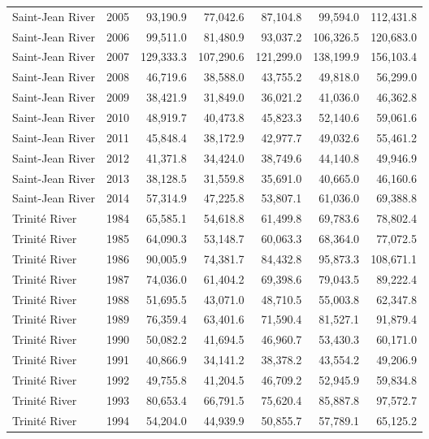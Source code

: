 \begin{longtable}{llrrrrr}
  Saint-Jean River & 2005 & 93,190.9 & 77,042.6 & 87,104.8 & 99,594.0 & 112,431.8 \\ 
  Saint-Jean River & 2006 & 99,511.0 & 81,480.9 & 93,037.2 & 106,326.5 & 120,683.0 \\ 
  Saint-Jean River & 2007 & 129,333.3 & 107,290.6 & 121,299.0 & 138,199.9 & 156,103.4 \\ 
  Saint-Jean River & 2008 & 46,719.6 & 38,588.0 & 43,755.2 & 49,818.0 & 56,299.0 \\ 
  Saint-Jean River & 2009 & 38,421.9 & 31,849.0 & 36,021.2 & 41,036.0 & 46,362.8 \\ 
  Saint-Jean River & 2010 & 48,919.7 & 40,473.8 & 45,823.3 & 52,140.6 & 59,061.6 \\ 
  Saint-Jean River & 2011 & 45,848.4 & 38,172.9 & 42,977.7 & 49,032.6 & 55,461.2 \\ 
  Saint-Jean River & 2012 & 41,371.8 & 34,424.0 & 38,749.6 & 44,140.8 & 49,946.9 \\ 
  Saint-Jean River & 2013 & 38,128.5 & 31,559.8 & 35,691.0 & 40,665.0 & 46,160.6 \\ 
  Saint-Jean River & 2014 & 57,314.9 & 47,225.8 & 53,807.1 & 61,036.0 & 69,388.8 \\ 
  Trinité River & 1984 & 65,585.1 & 54,618.8 & 61,499.8 & 69,783.6 & 78,802.4 \\ 
  Trinité River & 1985 & 64,090.3 & 53,148.7 & 60,063.3 & 68,364.0 & 77,072.5 \\ 
  Trinité River & 1986 & 90,005.9 & 74,381.7 & 84,432.8 & 95,873.3 & 108,671.1 \\ 
  Trinité River & 1987 & 74,036.0 & 61,404.2 & 69,398.6 & 79,043.5 & 89,222.4 \\ 
  Trinité River & 1988 & 51,695.5 & 43,071.0 & 48,710.5 & 55,003.8 & 62,347.8 \\ 
  Trinité River & 1989 & 76,359.4 & 63,401.6 & 71,590.4 & 81,527.1 & 91,879.4 \\ 
  Trinité River & 1990 & 50,082.2 & 41,694.5 & 46,960.7 & 53,430.3 & 60,171.0 \\ 
  Trinité River & 1991 & 40,866.9 & 34,141.2 & 38,378.2 & 43,554.2 & 49,206.9 \\ 
  Trinité River & 1992 & 49,755.8 & 41,204.5 & 46,709.2 & 52,945.9 & 59,834.8 \\ 
  Trinité River & 1993 & 80,653.4 & 66,791.5 & 75,620.4 & 85,887.8 & 97,572.7 \\ 
  Trinité River & 1994 & 54,204.0 & 44,939.9 & 50,855.7 & 57,789.1 & 65,125.2 \\ 

\end{longtable}
